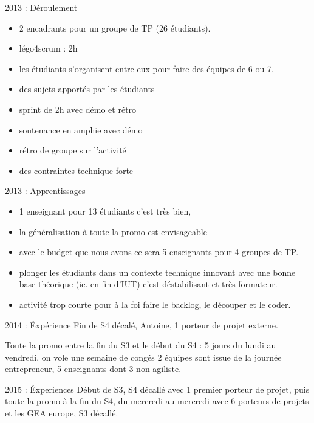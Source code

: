 \documentclass{beamer}
\begin{document}
\begin{frame}{2013 : Déroulement}
  \begin{itemize}
    \item 2 encadrants pour un groupe de TP (26 étudiants).
    \item légo4scrum : 2h
    \item les étudiants s'organisent entre eux pour faire des équipes de 6 ou 7.
    \item des sujets apportés par les étudiants
    \item sprint de 2h avec démo et rétro
    \item soutenance en amphie avec démo
    \item rétro de groupe sur l'activité
    \item des contraintes technique forte
  \end{itemize}
\end{frame}

\begin{frame}{2013 : Apprentissages}
  \begin{itemize}
    \item 1 enseignant pour 13 étudiants c'est très bien,
    \item la généralisation à toute la promo est envisageable
    \item avec le budget que nous avons ce sera 5 enseignants pour 4 groupes de TP.
    \item plonger les étudiants dans un contexte technique innovant avec une bonne base théorique (ie. en fin d'IUT) c'est déstabilisant et très formateur. 
    \item activité trop courte pour à la foi faire le backlog, le découper et le coder.
  \end{itemize}
\end{frame}

\begin{frame}{2014 : Éxpérience}
  Fin de S4 décalé, Antoine, 1 porteur de projet externe.

  Toute la promo entre la fin du S3 et le début du S4 : 5 jours du lundi au vendredi, on vole une semaine de congés
  2 équipes sont issue de la journée entrepreneur, 5 enseignants dont 3 non agiliste.
\end{frame}

\begin{frame}{2015 : Éxperiences}
  Début de S3, S4 décallé avec 1 premier porteur de projet, puis toute la promo à la fin du S4, du mercredi au mercredi avec 6 porteurs de projets et les GEA europe, S3 décallé.
\end{frame}
\end{document}
